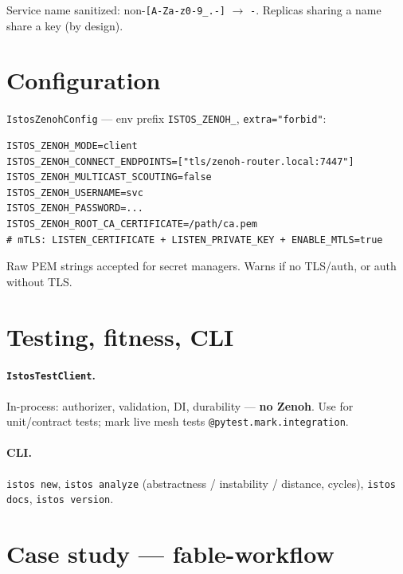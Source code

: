\documentclass[11pt,a4paper]{article}
\begin{document}
Service name sanitized: non-\texttt{[A-Za-z0-9\_.-]} $\to$ \texttt{-}. Replicas
sharing a name share a key (by design).

\section{Configuration}

\texttt{IstosZenohConfig} --- env prefix \texttt{ISTOS\_ZENOH\_},
\texttt{extra="forbid"}:

\begin{lstlisting}[language={}]
ISTOS_ZENOH_MODE=client
ISTOS_ZENOH_CONNECT_ENDPOINTS=["tls/zenoh-router.local:7447"]
ISTOS_ZENOH_MULTICAST_SCOUTING=false
ISTOS_ZENOH_USERNAME=svc
ISTOS_ZENOH_PASSWORD=...
ISTOS_ZENOH_ROOT_CA_CERTIFICATE=/path/ca.pem
# mTLS: LISTEN_CERTIFICATE + LISTEN_PRIVATE_KEY + ENABLE_MTLS=true
\end{lstlisting}

Raw PEM strings accepted for secret managers. Warns if no TLS/auth, or auth
without TLS.

\section{Testing, fitness, CLI}

\paragraph{\texttt{IstosTestClient}.} In-process: authorizer, validation, DI,
durability --- \textbf{no Zenoh}. Use for unit/contract tests; mark live mesh
tests \texttt{@pytest.mark.integration}.

\paragraph{CLI.} \texttt{istos new}, \texttt{istos analyze} (abstractness /
instability / distance, cycles), \texttt{istos docs}, \texttt{istos version}.

\section{Case study --- fable-workflow}
\end{document}

